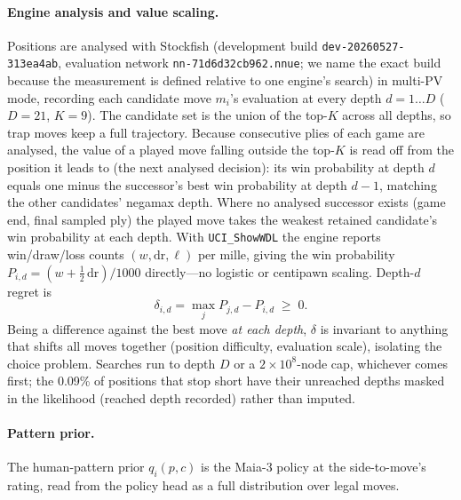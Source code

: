 \paragraph{Engine analysis and value scaling.}
Positions are analysed with Stockfish (development build \texttt{dev-20260527-313ea4ab},
evaluation network \texttt{nn-71d6d32cb962.nnue}; we name the exact build because the
measurement is defined relative to one engine's search) in multi-PV mode, recording each candidate move
$m_i$'s evaluation at every depth $d=1\ldots D$ ($D{=}21$, $K{=}9$). The candidate set is the
union of the top-$K$ across all depths, so trap moves keep a full trajectory. Because
consecutive plies of each game are analysed, the value of a played move falling outside the
top-$K$ is read off from the position it leads to (the next analysed decision): its win
probability at depth $d$ equals one minus the successor's best win probability at depth
$d{-}1$, matching the other candidates' negamax depth. Where no analysed successor exists
(game end, final sampled ply) the played move takes the weakest retained candidate's win
probability at each depth. With \texttt{UCI\_ShowWDL} the engine reports win/draw/loss counts
$(w,\mathrm{dr},\ell)$ per mille, giving the win probability
$P_{i,d}=(w+\tfrac12\,\mathrm{dr})/1000$ directly---no logistic or centipawn scaling.
Depth-$d$ regret is
\begin{equation}
\delta_{i,d}=\max_j P_{j,d}-P_{i,d}\;\ge\;0 .
\end{equation}
Being a difference against the best move \emph{at each depth}, $\delta$ is invariant to
anything that shifts all moves together (position difficulty, evaluation scale), isolating
the choice problem. Searches run to depth $D$ or a $2\times10^{8}$-node cap, whichever comes
first; the 0.09\% of positions that stop short have their unreached depths masked in the
likelihood (reached depth recorded) rather than imputed.

\paragraph{Pattern prior.}
The human-pattern prior $q_i(p,c)$ is the Maia-3 policy \citep{monroe2026} at the
side-to-move's rating, read from the policy head as a full distribution over legal moves.

